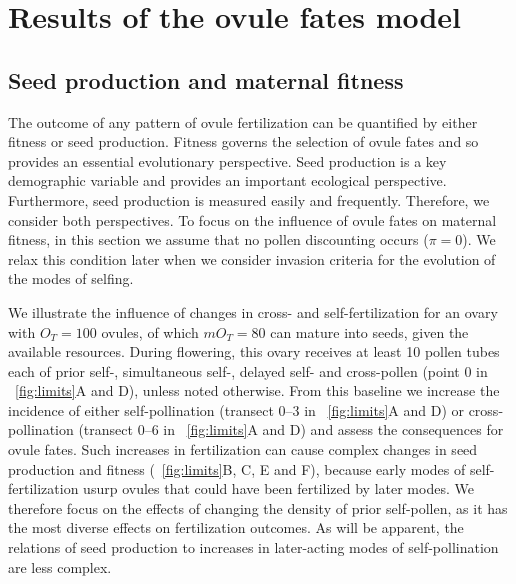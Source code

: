 \documentclass[letterpaper,titlepage]{scrartcl}
\begin{document}
\section{Results of the ovule fates model}

\subsection{Seed production and maternal fitness}
The outcome of any pattern of ovule fertilization can be quantified by
either fitness or seed production. Fitness governs the selection of
ovule fates and so provides an essential evolutionary
perspective. Seed production is a key demographic variable
\citetext{e.g., \citealp{Watkinson78,Bakker96}} and provides an
important ecological perspective. Furthermore, seed production is
measured easily and frequently. Therefore, we consider both
perspectives. To focus on the influence of ovule fates on maternal
fitness, in this section we assume that no pollen discounting occurs
($\pi =0$). We relax this condition later when we consider invasion
criteria for the evolution of the modes of selfing.

We illustrate the influence of changes in cross- and
self-fertilization for an ovary with $O_{T}=100$ ovules, of which
$mO_{T}=80$ can mature into seeds, given the available
resources. During flowering, this ovary receives at least 10 pollen
tubes each of prior self-, simultaneous self-, delayed self- and
cross-pollen (point 0 in {\fref}~\ref{fig:limits}A and D), unless
noted otherwise. From this baseline we increase the incidence of
either self-pollination (transect 0--3 in {\fref}~\ref{fig:limits}A
and D) or cross-pollination (transect 0--6 in
{\fref}~\ref{fig:limits}A and D) and assess the consequences for ovule
fates. Such increases in fertilization can cause complex changes in
seed production and fitness ({\fref}~\ref{fig:limits}B, C, E and F),
because early modes of self-fertilization usurp ovules that could have
been fertilized by later modes. We therefore focus on the effects of
changing the density of prior self-pollen, as it has the most diverse
effects on fertilization outcomes. As will be apparent, the relations
of seed production to increases in later-acting modes of
self-pollination are less complex.
\end{document}
